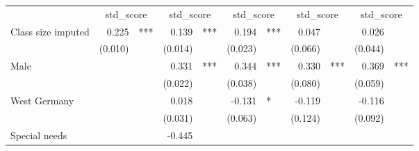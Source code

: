 \documentclass{article}
\begin{document}
\begin{table}[!h]
\centering
\begin{tabular}{lllllllllll}
\cline{1-11}
\multicolumn{1}{r}{} &
  \multicolumn{2}{c}{std\_score} &
  \multicolumn{2}{c}{std\_score} &
  \multicolumn{2}{c}{std\_score} &
  \multicolumn{2}{c}{std\_score} &
  \multicolumn{2}{c}{std\_score} \\
\cline{1-11}
\multicolumn{1}{l}{Class size imputed} &
  \multicolumn{1}{r}{0.225} &
  \multicolumn{1}{l}{***} &
  \multicolumn{1}{r}{0.139} &
  \multicolumn{1}{l}{***} &
  \multicolumn{1}{r}{0.194} &
  \multicolumn{1}{l}{***} &
  \multicolumn{1}{r}{0.047} &
  \multicolumn{1}{l}{} &
  \multicolumn{1}{r}{0.026} &
  \multicolumn{1}{l}{} \\
\multicolumn{1}{l}{} &
  \multicolumn{1}{r}{(0.010)} &
  \multicolumn{1}{l}{} &
  \multicolumn{1}{r}{(0.014)} &
  \multicolumn{1}{l}{} &
  \multicolumn{1}{r}{(0.023)} &
  \multicolumn{1}{l}{} &
  \multicolumn{1}{r}{(0.066)} &
  \multicolumn{1}{l}{} &
  \multicolumn{1}{r}{(0.044)} &
  \multicolumn{1}{l}{} \\
\multicolumn{1}{l}{Male} &
  \multicolumn{1}{r}{} &
  \multicolumn{1}{l}{} &
  \multicolumn{1}{r}{0.331} &
  \multicolumn{1}{l}{***} &
  \multicolumn{1}{r}{0.344} &
  \multicolumn{1}{l}{***} &
  \multicolumn{1}{r}{0.330} &
  \multicolumn{1}{l}{***} &
  \multicolumn{1}{r}{0.369} &
  \multicolumn{1}{l}{***} \\
\multicolumn{1}{l}{} &
  \multicolumn{1}{r}{} &
  \multicolumn{1}{l}{} &
  \multicolumn{1}{r}{(0.022)} &
  \multicolumn{1}{l}{} &
  \multicolumn{1}{r}{(0.038)} &
  \multicolumn{1}{l}{} &
  \multicolumn{1}{r}{(0.080)} &
  \multicolumn{1}{l}{} &
  \multicolumn{1}{r}{(0.059)} &
  \multicolumn{1}{l}{} \\
\multicolumn{1}{l}{West Germany} &
  \multicolumn{1}{r}{} &
  \multicolumn{1}{l}{} &
  \multicolumn{1}{r}{0.018} &
  \multicolumn{1}{l}{} &
  \multicolumn{1}{r}{-0.131} &
  \multicolumn{1}{l}{*} &
  \multicolumn{1}{r}{-0.119} &
  \multicolumn{1}{l}{} &
  \multicolumn{1}{r}{-0.116} &
  \multicolumn{1}{l}{} \\
\multicolumn{1}{l}{} &
  \multicolumn{1}{r}{} &
  \multicolumn{1}{l}{} &
  \multicolumn{1}{r}{(0.031)} &
  \multicolumn{1}{l}{} &
  \multicolumn{1}{r}{(0.063)} &
  \multicolumn{1}{l}{} &
  \multicolumn{1}{r}{(0.124)} &
  \multicolumn{1}{l}{} &
  \multicolumn{1}{r}{(0.092)} &
  \multicolumn{1}{l}{} \\
\multicolumn{1}{l}{Special needs} &
  \multicolumn{1}{r}{} &
  \multicolumn{1}{l}{} &
  \multicolumn{1}{r}{-0.445} &

\end{tabular}
\end{table}
\end{document}
